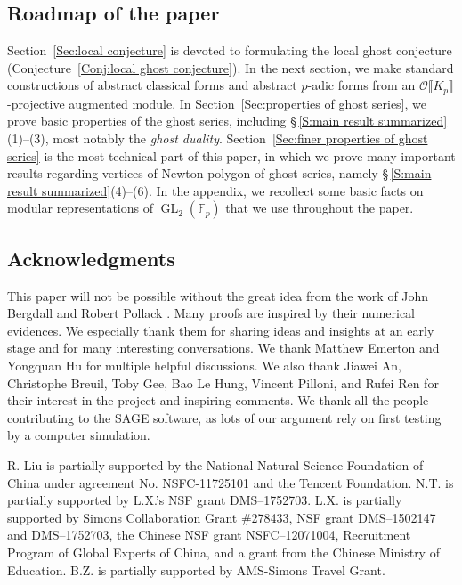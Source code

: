 \documentclass[12pt]{amsart}
\theoremstyle{definition}
\numberwithin{equation}{subsection}
\def\calO{\mathcal{O}}
\def\FF{\mathbb{F}}
\DeclareMathOperator{\GL}{GL}
\begin{document}
\subsection*{Roadmap of the paper}
Section~\ref{Sec:local conjecture} is devoted to formulating the local ghost conjecture (Conjecture~\ref{Conj:local ghost conjecture}). In the next section, we make standard constructions of abstract classical forms and abstract $p$-adic forms from an $\calO\llbracket K_p\rrbracket$-projective augmented module. In Section~\ref{Sec:properties of ghost series}, we prove basic properties of the ghost series, including \S\,\ref{S:main result summarized}(1)--(3),
most notably the \emph{ghost duality}. Section~\ref{Sec:finer properties of ghost series} is the most technical part of this paper, in which we prove many important results regarding vertices of Newton polygon of ghost series, namely \S\,\ref{S:main result summarized}(4)--(6). In the appendix, we recollect some basic facts on modular representations of $\GL_2(\FF_p)$ that we use throughout the paper.


\subsection*{Acknowledgments}
This paper will not be possible without the great idea from the work of John Bergdall and Robert Pollack \cite{bergdall-pollack2,bergdall-pollack3}.
Many proofs are inspired by their numerical evidences.  We especially thank them for sharing ideas and insights at an early stage and for many interesting conversations.
We thank Matthew Emerton and Yongquan Hu for multiple helpful discussions. We also thank Jiawei An, Christophe Breuil, Toby Gee, Bao Le Hung, Vincent Pilloni, and Rufei Ren for their interest in the project and inspiring comments.
We thank all the people contributing to the SAGE software, as lots of our argument rely on first testing by a computer simulation.

R. Liu is partially supported by the National Natural Science Foundation of China under agreement No. NSFC-11725101 and the Tencent Foundation. N.T. is partially supported by L.X.'s NSF grant DMS--1752703.
L.X. is  partially supported by Simons Collaboration Grant \#278433, NSF grant DMS--1502147 and DMS--1752703, the Chinese NSF grant NSFC--12071004, Recruitment Program of Global Experts of China, and a grant
from the Chinese Ministry of Education. B.Z. is partially supported by
AMS-Simons Travel Grant.
\end{document}
